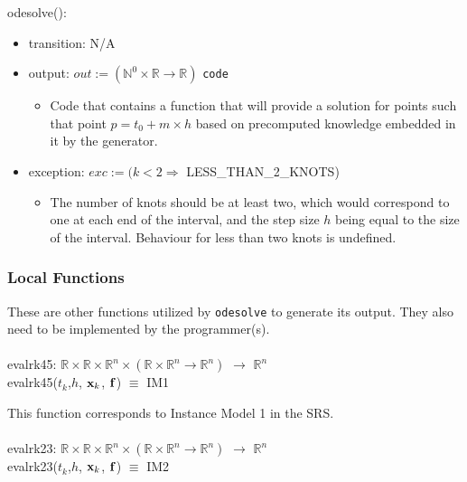 \documentclass[12pt, titlepage]{article}
\begin{document}
\noindent odesolve():
\begin{itemize}
  \item transition: N/A
  \item output: $ out := (\mathbb{N}^0 \times \mathbb{R} \rightarrow 
  \mathbb{R})$ 
  \texttt{code}
  \begin{itemize}
    \item Code that contains a function that will provide a solution for points 
    such that point $p = t_0 + m \times h$ based on precomputed knowledge
    embedded in it by the generator. 
  \end{itemize}
  \item exception: $exc := (k < 2 \Rightarrow$ LESS\_THAN\_2\_KNOTS)
  \begin{itemize}
    \item The number of knots should be at least two, which would correspond to 
    one at each end of the interval, and the step size $h$ being equal to the 
    size of the interval. Behaviour for less than two knots is undefined.
  \end{itemize}
\end{itemize}

\subsubsection{Local Functions} 

These are other functions utilized by \lstinline[language=ML]|odesolve| to 
generate its output. They also need to be implemented by the programmer(s).\\
\\
evalrk45: $\mathbb{R} \times \mathbb{R} \times \mathbb{R}^n \times (\mathbb{R} 
\times \mathbb{R}^n \rightarrow \mathbb{R}^n)$ $\rightarrow$ $\mathbb{R}^n$\\
evalrk45($t_k$,$h$, ${\bf x}_k$, ${\bf f}$) $\equiv$ IM1

This function corresponds to Instance Model 1 in the SRS.\\
\\
evalrk23: $\mathbb{R} \times \mathbb{R} \times \mathbb{R}^n \times (\mathbb{R} 
\times \mathbb{R}^n \rightarrow \mathbb{R}^n)$ $\rightarrow$ $\mathbb{R}^n$\\
evalrk23($t_k$,$h$, ${\bf x}_k$, ${\bf f}$) $\equiv$ IM2
\end{document}

